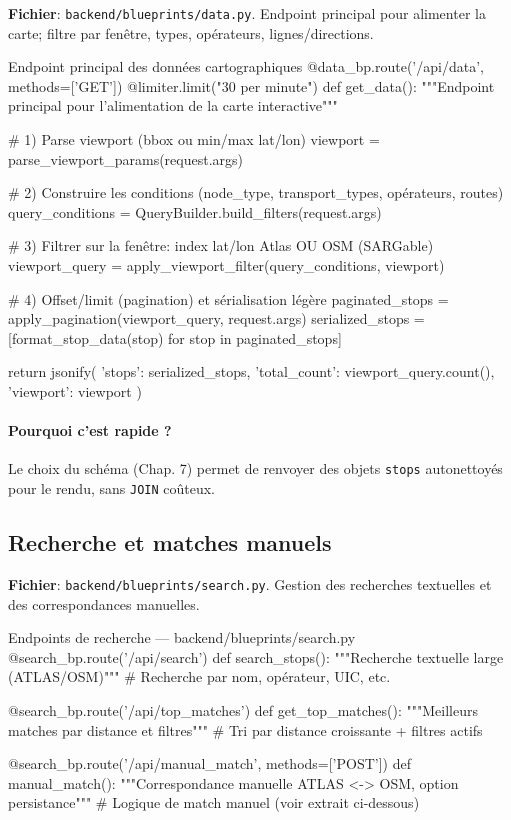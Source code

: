 \textbf{Fichier}: \texttt{backend/blueprints/data.py}. Endpoint principal pour alimenter la carte; filtre par fenêtre, types, opérateurs, lignes/directions.

\begin{codebox}[language=Python]{Endpoint principal des données cartographiques}
@data_bp.route('/api/data', methods=['GET'])
@limiter.limit("30 per minute")
def get_data():
    """Endpoint principal pour l'alimentation de la carte interactive"""
    
    # 1) Parse viewport (bbox ou min/max lat/lon)
    viewport = parse_viewport_params(request.args)
    
    # 2) Construire les conditions (node_type, transport_types, opérateurs, routes)
    query_conditions = QueryBuilder.build_filters(request.args)
    
    # 3) Filtrer sur la fenêtre: index lat/lon Atlas OU OSM (SARGable)
    viewport_query = apply_viewport_filter(query_conditions, viewport)
    
    # 4) Offset/limit (pagination) et sérialisation légère
    paginated_stops = apply_pagination(viewport_query, request.args)
    serialized_stops = [format_stop_data(stop) for stop in paginated_stops]
    
    return jsonify({
        'stops': serialized_stops,
        'total_count': viewport_query.count(),
        'viewport': viewport
    })
\end{codebox}

\paragraph{Pourquoi c'est rapide ?} Le choix du schéma (Chap. 7) permet de renvoyer des objets \texttt{stops} autonettoyés pour le rendu, sans \texttt{JOIN} coûteux.

\subsection{Recherche et matches manuels}

\textbf{Fichier}: \texttt{backend/blueprints/search.py}. Gestion des recherches textuelles et des correspondances manuelles.

\begin{codebox}[language=Python]{Endpoints de recherche — backend/blueprints/search.py}
@search_bp.route('/api/search')
def search_stops():
    """Recherche textuelle large (ATLAS/OSM)"""
    # Recherche par nom, opérateur, UIC, etc.

@search_bp.route('/api/top_matches')  
def get_top_matches():
    """Meilleurs matches par distance et filtres"""
    # Tri par distance croissante + filtres actifs

@search_bp.route('/api/manual_match', methods=['POST'])
def manual_match():
    """Correspondance manuelle ATLAS <-> OSM, option persistance"""
    # Logique de match manuel (voir extrait ci-dessous)
\end{codebox}

